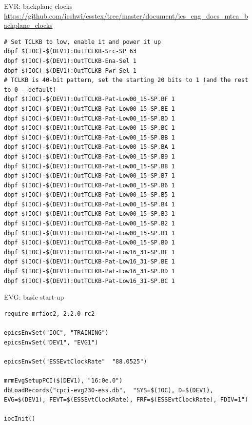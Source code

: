\documentclass[
  9pt
  , table
  , ignorenonframetext
]{beamer}
\begin{document}
\begin{frame}[fragile]{EVR: backplane clocks}
\url{https://github.com/icshwi/esstex/tree/master/document/ics_eng_docs_mtca_backplane_clocks}
\begin{lstlisting}[style=termstyle,breaklines=true,basicstyle=\scriptsize]
# Set TCLKB to low, enable it and power it up
dbpf $(IOC)-$(DEV1):OutTCLKB-Src-SP 63
dbpf $(IOC)-$(DEV1):OutTCLKB-Ena-Sel 1
dbpf $(IOC)-$(DEV1):OutTCLKB-Pwr-Sel 1
# TCLKB is 40-bit pattern, set the starting 20 bits to 1 (and the rest to 0 - default)
dbpf $(IOC)-$(DEV1):OutTCLKB-Pat-Low00_15-SP.BF 1
dbpf $(IOC)-$(DEV1):OutTCLKB-Pat-Low00_15-SP.BE 1
dbpf $(IOC)-$(DEV1):OutTCLKB-Pat-Low00_15-SP.BD 1
dbpf $(IOC)-$(DEV1):OutTCLKB-Pat-Low00_15-SP.BC 1
dbpf $(IOC)-$(DEV1):OutTCLKB-Pat-Low00_15-SP.BB 1
dbpf $(IOC)-$(DEV1):OutTCLKB-Pat-Low00_15-SP.BA 1
dbpf $(IOC)-$(DEV1):OutTCLKB-Pat-Low00_15-SP.B9 1
dbpf $(IOC)-$(DEV1):OutTCLKB-Pat-Low00_15-SP.B8 1
dbpf $(IOC)-$(DEV1):OutTCLKB-Pat-Low00_15-SP.B7 1
dbpf $(IOC)-$(DEV1):OutTCLKB-Pat-Low00_15-SP.B6 1
dbpf $(IOC)-$(DEV1):OutTCLKB-Pat-Low00_15-SP.B5 1
dbpf $(IOC)-$(DEV1):OutTCLKB-Pat-Low00_15-SP.B4 1
dbpf $(IOC)-$(DEV1):OutTCLKB-Pat-Low00_15-SP.B3 1
dbpf $(IOC)-$(DEV1):OutTCLKB-Pat-Low00_15-SP.B2 1
dbpf $(IOC)-$(DEV1):OutTCLKB-Pat-Low00_15-SP.B1 1
dbpf $(IOC)-$(DEV1):OutTCLKB-Pat-Low00_15-SP.B0 1
dbpf $(IOC)-$(DEV1):OutTCLKB-Pat-Low16_31-SP.BF 1
dbpf $(IOC)-$(DEV1):OutTCLKB-Pat-Low16_31-SP.BE 1
dbpf $(IOC)-$(DEV1):OutTCLKB-Pat-Low16_31-SP.BD 1
dbpf $(IOC)-$(DEV1):OutTCLKB-Pat-Low16_31-SP.BC 1
\end{lstlisting}
\end{frame}

\begin{frame}[fragile]{EVG: basic start-up}
\begin{lstlisting}[style=termstyle,breaklines=true,basicstyle=\scriptsize]
require mrfioc2, 2.2.0-rc2

epicsEnvSet("IOC", "TRAINING")
epicsEnvSet("DEV1", "EVG1")

epicsEnvSet("ESSEvtClockRate"  "88.0525")

mrmEvgSetupPCI($(DEV1), "16:0e.0")
dbLoadRecords("cpci-evg230-ess.db",  "SYS=$(IOC), D=$(DEV1), EVG=$(DEV1), FEVT=$(ESSEvtClockRate), FRF=$(ESSEvtClockRate), FDIV=1")

iocInit()
\end{lstlisting}
\end{frame}
\end{document}
